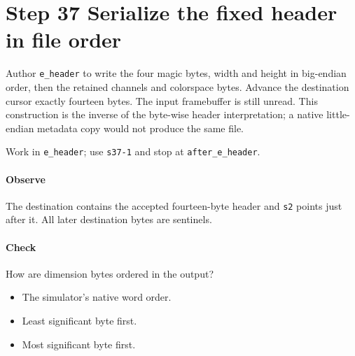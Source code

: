\section{Step 37 Serialize the fixed header in file order}\label{qoi-s37}
Author \texttt{e\_header} to write the four magic bytes, width and height in big-endian order, then the retained channels and colorspace bytes. Advance the destination cursor exactly fourteen bytes. The input framebuffer is still unread. This construction is the inverse of the byte-wise header interpretation; a native little-endian metadata copy would not produce the same file.

Work in \texttt{e\_header}; use \texttt{s37-1} and stop at \texttt{after\_e\_header}.

\paragraph{Observe} The destination contains the accepted fourteen-byte header and \texttt{s2} points just after it. All later destination bytes are sentinels.

\paragraph{Check} How are dimension bytes ordered in the output?
\begin{itemize}
\item[A.] The simulator’s native word order.
\item[B.] Least significant byte first.
\item[C.] Most significant byte first.
\end{itemize}
